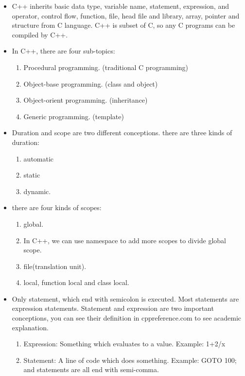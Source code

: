 \documentclass[a4paper,12pt,twoside]{book}
\begin{document}
\begin{itemize}
    \item C++ inherits basic data type, variable name, statement, expression, and operator, control flow, function, file, head file and library, array, pointer and structure from C language. C++ is subset of C, so any C programs can be compiled by C++.
    
    \item In C++, there are four sub-topics: 
    
    \begin{enumerate}
        \item Procedural programming. (traditional C programming)
        \item Object-base programming. (class and object)
        \item Object-orient programming. (inheritance)
        \item Generic programming. (template)
    \end{enumerate}
    
    \item Duration and scope are two different conceptions. there are three kinds of duration:
    \begin{enumerate}
        \item automatic 
        \item static 
        \item dynamic. 
    \end{enumerate}
    
    \item there are four kinds of scopes:
    \begin{enumerate}
        \item global.
        \item In C++, we can use namespace to add more scopes to divide global scope.
        \item file(translation unit).
        \item local, function local and class local. 
    \end{enumerate}
    
    \item Only statement, which end with semicolon is executed. Most statements are expression statements. Statement and expression are two important conceptions, you can see their definition in cppreference.com to see academic explanation.
    
    \begin{enumerate}
    	\item Expression: Something which evaluates to a value. Example: 1+2/x
    	\item Statement: A line of code which does something. Example: GOTO 100; and statements are all end with semi-comma.
    \end{enumerate}
    

\end{itemize}
\end{document}
